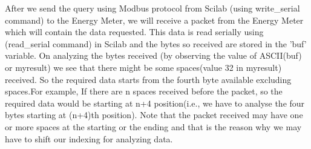 After we send the query using Modbus protocol from Scilab (using
write\_serial command) to the Energy Meter, we will receive a packet
from the Energy Meter which will contain the data requested. This data
is read serially using (read\_serial command) in Scilab and the bytes
so received are stored in the 'buf' variable. On analyzing the bytes
received (by observing the value of ASCII(buf) or myresult) we see
that there might be some spaces(value 32 in myresult) received. So the
required data starts from the fourth byte available excluding
spaces.For example, If there are n spaces received before the packet,
so the required data would be starting at n+4 position(i.e., we have
to analyse the four bytes starting at (n+4)th position). Note that the
packet received may have one or more spaces at the starting or the
ending and that is the reason why we may have to shift our indexing
for analyzing data.
